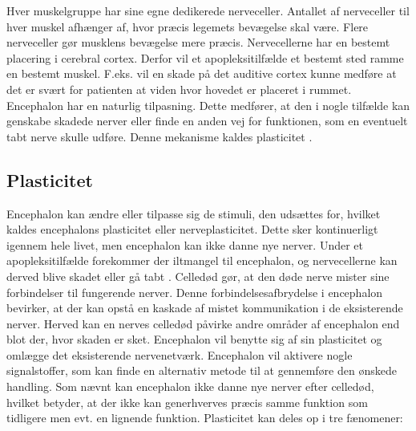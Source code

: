 
Hver muskelgruppe har sine egne dedikerede nerveceller. Antallet af nerveceller til hver muskel afhænger af, hvor præcis legemets bevægelse skal være. Flere nerveceller gør musklens bevægelse mere præcis. \cite{Stanfield2014} Nervecellerne har en bestemt placering i cerebral cortex. Derfor vil et apopleksitilfælde et bestemt sted ramme en bestemt muskel. F.eks. vil en skade på det auditive cortex kunne medføre at det er svært for patienten at viden hvor hovedet er placeret i rummet. \cite{http://www.ncbi.nlm.nih.gov/pmc/articles/PMC4211206/} 
Encephalon har en naturlig tilpasning. Dette medfører, at den i nogle tilfælde kan genskabe skadede nerver eller finde en anden vej for funktionen, som en eventuelt tabt nerve skulle udføre. \cite{Martini2012} Denne mekanisme kaldes plasticitet \cite{Ramanathan2006}. 

\subsection{Plasticitet}
Encephalon kan ændre eller tilpasse sig de stimuli, den udsættes for, hvilket kaldes encephalons plasticitet eller nerveplasticitet. Dette sker kontinuerligt igennem hele livet, men encephalon kan ikke danne nye nerver. \cite{Stanfield2014} Under et apopleksitilfælde forekommer der iltmangel til encephalon, og nervecellerne kan derved blive skadet eller gå tabt \cite{Schulze2011}. Celledød gør, at den døde nerve mister sine forbindelser til fungerende nerver. Denne forbindelsesafbrydelse i encephalon bevirker, at der kan opstå en kaskade af mistet kommunikation i de eksisterende nerver. Herved kan en nerves celledød påvirke andre områder af encephalon end blot der, hvor skaden er sket. \cite{Raine2009} Encephalon vil benytte sig af sin plasticitet og omlægge det eksisterende nervenetværk. Encephalon vil aktivere nogle signalstoffer, som kan finde en alternativ metode til at gennemføre den ønskede handling. \cite{Rugnett2015}  Som nævnt kan encephalon ikke danne nye nerver efter celledød, hvilket betyder, at der ikke kan generhverves præcis samme funktion som tidligere men evt. en lignende funktion. %
Plasticitet kan deles op i tre fænomener: \cite{Raine2009}

